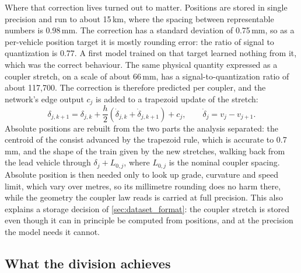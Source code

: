 Where that correction lives turned out to matter. Positions are stored in single precision and run to about 15\,km, where the spacing between representable numbers is 0.98\,mm. The correction has a standard deviation of 0.75\,mm, so as a per-vehicle position target it is mostly rounding error: the ratio of signal to quantization is 0.77. A first model trained on that target learned nothing from it, which was the correct behaviour. The same physical quantity expressed as a coupler stretch, on a scale of about 66\,mm, has a signal-to-quantization ratio of about 117,700. The correction is therefore predicted per coupler, and the network's edge output $c_j$ is added to a trapezoid update of the stretch:
\begin{equation}
    \delta_{j,k+1} = \delta_{j,k} + \frac{h}{2}\left(\dot\delta_{j,k} + \dot\delta_{j,k+1}\right) + c_j,
    \qquad \dot\delta_j = v_j - v_{j+1} .
    \label{eq:arch_stretch}
\end{equation}
Absolute positions are rebuilt from the two parts the analysis separated: the centroid of the consist advanced by the trapezoid rule, which is accurate to 0.7\,mm, and the shape of the train given by the new stretches, walking back from the lead vehicle through $\delta_j + L_{0,j}$, where $L_{0,j}$ is the nominal coupler spacing. Absolute position is then needed only to look up grade, curvature and speed limit, which vary over metres, so its millimetre rounding does no harm there, while the geometry the coupler law reads is carried at full precision. This also explains a storage decision of \cref{sec:dataset_format}: the coupler stretch is stored even though it can in principle be computed from positions, and at the precision the model needs it cannot.

\subsection{What the division achieves}

